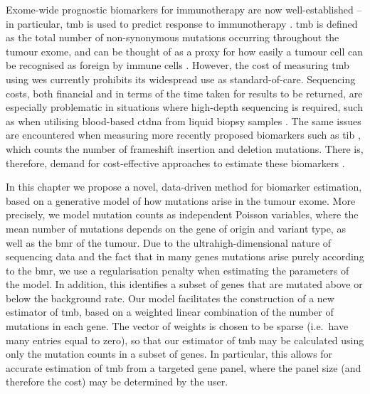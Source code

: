 \documentclass[../thesis.tex]{subfiles}
\begin{document}
Exome-wide prognostic biomarkers for immunotherapy are now well-established -- in particular, \gls{tmb} is used to predict response to immunotherapy \citep{zhu_association_2019, cao_high_2019}.  \gls{tmb} is defined as the total number of non-synonymous mutations occurring throughout the tumour exome, and can be thought of as a proxy for how easily a tumour cell can be recognised as foreign by immune cells \citep{chan_development_2019}. However, the cost of measuring \gls{tmb} using \gls{wes} \citep{sboner_real_2011} currently prohibits its widespread use as standard-of-care.  Sequencing costs, both financial and in terms of the time taken for results to be returned, are especially problematic in situations where high-depth sequencing is required, such as when utilising blood-based \gls{ctdna} from liquid biopsy samples \citep{gandara_blood-based_2018}. The same issues are encountered when measuring more recently proposed biomarkers such as \gls{tib} \citep{wu_tumor_2019,turajlic_insertion-and-deletion-derived_2017}, which counts the number of frameshift insertion and deletion mutations. There is, therefore, demand for cost-effective approaches to estimate these biomarkers \citep{fancello_tumor_2019, golkaram_interplay_2020}.

In this chapter we propose a novel, data-driven method for biomarker estimation, based on a generative model of how mutations arise in the tumour exome.  More precisely, we model mutation counts as independent Poisson variables, where the mean number of mutations depends on the gene of origin and variant type, as well as the \gls{bmr} of the tumour. Due to the ultrahigh-dimensional nature of sequencing data and the fact that in many genes mutations arise purely according to the \gls{bmr}, we use a regularisation penalty when estimating the parameters of the model. In addition, this identifies a subset of genes that are mutated above or below the background rate.  Our model facilitates the construction of a new estimator of \gls{tmb}, based on a weighted linear combination of the number of mutations in each gene. The vector of weights is chosen to be sparse (i.e.~have many entries equal to zero), so that our estimator of \gls{tmb} may be calculated using only the mutation counts in a subset of genes. In particular, this allows for accurate estimation of \gls{tmb} from a targeted gene panel, where the panel size (and therefore the cost) may be determined by the user.  
\end{document}
